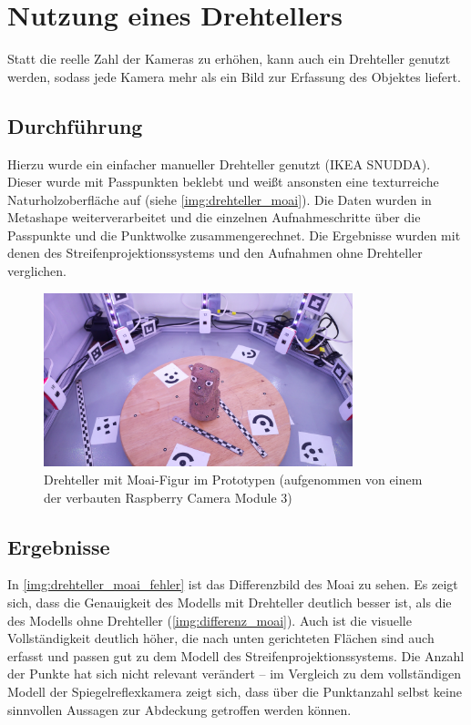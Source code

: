 \documentclass[./00PhotoBox.tex]{subfiles}
\begin{document}
\section{Nutzung eines Drehtellers}
\label{s:drehteller}
Statt die reelle Zahl der Kameras zu erhöhen, kann auch ein Drehteller genutzt werden, sodass jede Kamera mehr als ein Bild zur Erfassung des Objektes liefert.

\subsection{Durchführung}
Hierzu wurde ein einfacher manueller Drehteller genutzt (IKEA SNUDDA). Dieser wurde mit Passpunkten beklebt und weißt ansonsten eine texturreiche Naturholzoberfläche auf (siehe \autoref{img:drehteller_moai}). Die Daten wurden in Metashape weiterverarbeitet und die einzelnen Aufnahmeschritte über die Passpunkte und die Punktwolke zusammengerechnet. Die Ergebnisse wurden mit denen des Streifenprojektionssystems und den Aufnahmen ohne Drehteller verglichen.

\begin{figure}
    \centering
    \includegraphics[width=0.8\textwidth]{img/drehteller_moai.jpg}
    \caption{Drehteller mit Moai-Figur im Prototypen (aufgenommen von einem der verbauten Raspberry Camera Module 3)}
    \label{img:drehteller_moai}
\end{figure}

\subsection{Ergebnisse}

In \autoref{img:drehteller_moai_fehler} ist das Differenzbild des Moai zu sehen. Es zeigt sich, dass die Genauigkeit des Modells mit Drehteller deutlich besser ist, als die des Modells ohne Drehteller (\autoref{img:differenz_moai}). Auch ist die visuelle Vollständigkeit deutlich höher, die nach unten gerichteten Flächen sind auch erfasst und passen gut zu dem Modell des Streifenprojektionssystems. Die Anzahl der Punkte hat sich nicht relevant verändert -- im Vergleich zu dem vollständigen Modell der Spiegelreflexkamera zeigt sich, dass über die Punktanzahl selbst keine sinnvollen Aussagen zur Abdeckung getroffen werden können.
\end{document}
